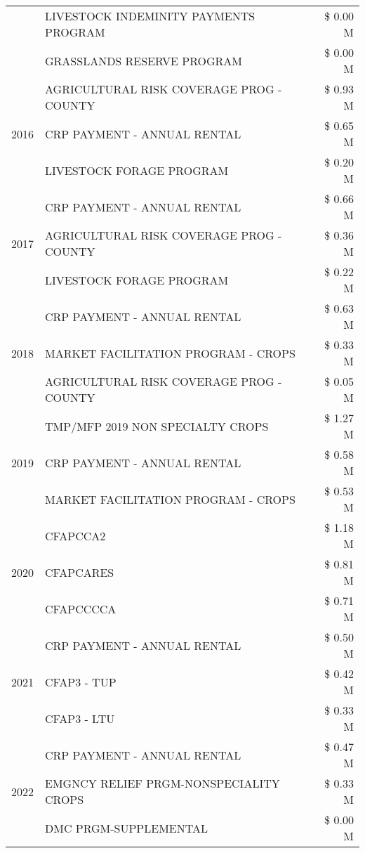 \begin{tabular}{llr}
 & LIVESTOCK INDEMINITY PAYMENTS PROGRAM & \$ 0.00 M \\
 & GRASSLANDS RESERVE PROGRAM & \$ 0.00 M \\
\cline{1-3}
\multirow[t]{3}{*}{2016} & AGRICULTURAL RISK COVERAGE PROG - COUNTY & \$ 0.93 M \\
 & CRP PAYMENT - ANNUAL RENTAL & \$ 0.65 M \\
 & LIVESTOCK FORAGE PROGRAM & \$ 0.20 M \\
\cline{1-3}
\multirow[t]{3}{*}{2017} & CRP PAYMENT - ANNUAL RENTAL & \$ 0.66 M \\
 & AGRICULTURAL RISK COVERAGE PROG - COUNTY & \$ 0.36 M \\
 & LIVESTOCK FORAGE PROGRAM & \$ 0.22 M \\
\cline{1-3}
\multirow[t]{3}{*}{2018} & CRP PAYMENT - ANNUAL RENTAL & \$ 0.63 M \\
 & MARKET FACILITATION PROGRAM - CROPS & \$ 0.33 M \\
 & AGRICULTURAL RISK COVERAGE PROG - COUNTY & \$ 0.05 M \\
\cline{1-3}
\multirow[t]{3}{*}{2019} & TMP/MFP 2019 NON SPECIALTY CROPS & \$ 1.27 M \\
 & CRP PAYMENT - ANNUAL RENTAL & \$ 0.58 M \\
 & MARKET FACILITATION PROGRAM - CROPS & \$ 0.53 M \\
\cline{1-3}
\multirow[t]{3}{*}{2020} & CFAPCCA2 & \$ 1.18 M \\
 & CFAPCARES & \$ 0.81 M \\
 & CFAPCCCCA & \$ 0.71 M \\
\cline{1-3}
\multirow[t]{3}{*}{2021} & CRP PAYMENT - ANNUAL RENTAL & \$ 0.50 M \\
 & CFAP3 - TUP & \$ 0.42 M \\
 & CFAP3 - LTU & \$ 0.33 M \\
\cline{1-3}
\multirow[t]{3}{*}{2022} & CRP PAYMENT - ANNUAL RENTAL & \$ 0.47 M \\
 & EMGNCY RELIEF PRGM-NONSPECIALITY CROPS & \$ 0.33 M \\
 & DMC PRGM-SUPPLEMENTAL & \$ 0.00 M \\
\cline{1-3}
\bottomrule
\end{tabular}
